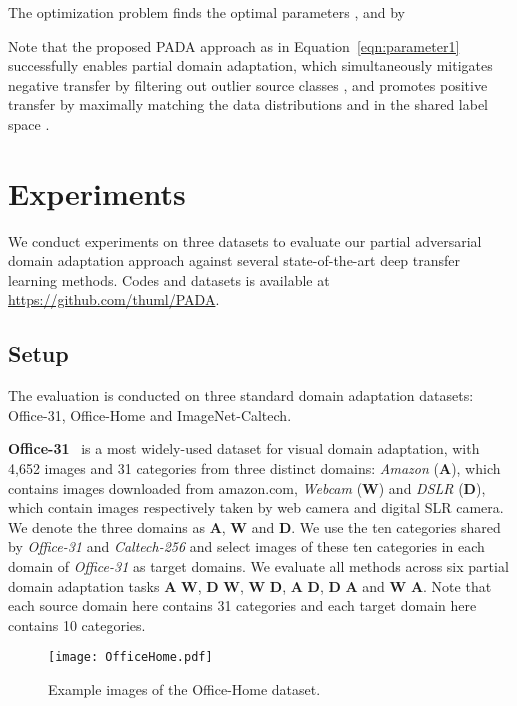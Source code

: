 \documentclass[runningheads]{llncs}
\begin{document}
The optimization problem finds the optimal parameters ,  and  by

Note that the proposed PADA approach as in Equation~\eqref{eqn:parameter1} successfully enables partial domain adaptation, which simultaneously mitigates negative transfer by filtering out outlier source classes , and promotes positive transfer by maximally matching the data distributions  and  in the shared label space .

\section{Experiments}
We conduct experiments on three datasets to evaluate our partial adversarial domain adaptation approach against several state-of-the-art deep transfer learning methods. Codes and datasets is available at \url{https://github.com/thuml/PADA}.

\subsection{Setup}
The evaluation is conducted on three standard domain adaptation datasets: Office-31, Office-Home and ImageNet-Caltech.

\textbf{Office-31}~\cite{cite:ECCV10Office} is a most widely-used dataset for visual domain adaptation, with 4,652
images and 31 categories from three distinct domains: \textit{Amazon} (\textbf{A}), which contains images
downloaded from amazon.com, \textit{Webcam} (\textbf{W}) and \textit{DSLR} (\textbf{D}), which contain images respectively taken by web camera and digital SLR camera. We denote the three domains as \textbf{A}, \textbf{W} and \textbf{D}. We use the ten categories shared by \textit{Office-31} and \textit{Caltech-256} and select images of these ten categories in each domain of \textit{Office-31} as target domains. We evaluate all methods across
six partial domain adaptation tasks \textbf{A}  \textbf{W}, \textbf{D}  \textbf{W}, \textbf{W}  \textbf{D}, \textbf{A}  \textbf{D}, \textbf{D}  \textbf{A} and \textbf{W}  \textbf{A}. Note that each source domain here contains 31 categories and each target domain here contains 10 categories.

\begin{figure}[h]
  \centering
  \texttt{[image: OfficeHome.pdf]}
  \caption{Example images of the Office-Home dataset.}
  \label{fig:data}
\end{figure}
\end{document}
